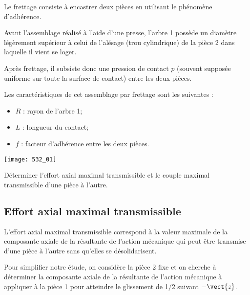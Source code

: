 \normaltrue \difficilefalse \tdifficilefalse
\correctionfalse


\setcounter{question}{0}
\ifcorrection
\else
{}
\fi


\ifprof
\else

Le frettage consiste à encastrer deux pièces en utilisant le phénomène d’adhérence. 
 
Avant l’assemblage réalisé à l’aide d’une presse, l’arbre 1 
possède un diamètre légèrement supérieur à celui de l’alésage 
(trou cylindrique) de la pièce 2 dans laquelle il vient se loger. 
 
Après frettage, il subsiste donc une pression de contact $p$ 
(souvent supposée uniforme sur toute la surface de contact) 
entre les deux pièces. 

 
Les caractéristiques de cet assemblage par frettage sont les suivantes : 
\begin{itemize}
\item $R$ : rayon de l’arbre 1;
\item $L$ : longueur du contact; 
\item $f$ : facteur d’adhérence entre les deux pièces.
\end{itemize}



\begin{center}
\texttt{[image: 532\_01]}
\end{center}


\begin{obj}
Déterminer l’effort axial maximal transmissible et le couple maximal transmissible d’une pièce à 
l’autre.
\end{obj}

\subsection*{Effort axial maximal transmissible}


L’effort axial maximal transmissible correspond à la valeur maximale de la 
composante axiale de la résultante de l’action mécanique qui peut être transmise 
d’une pièce à l’autre sans qu’elles se désolidarisent. 
 
Pour simplifier notre étude, on considère la pièce 2 fixe et on cherche à déterminer 
la composante axiale de la résultante de l’action mécanique à appliquer à la pièce 1 
pour atteindre le glissement de 1/2 suivant $-\vect{z}$. 


